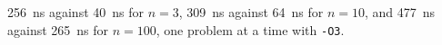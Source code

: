 256~ns against 40~ns for $n = 3$, 309~ns against 64~ns for $n = 10$, and 477~ns against 265~ns for $n = 100$, one problem at a time with \texttt{-O3}.%

